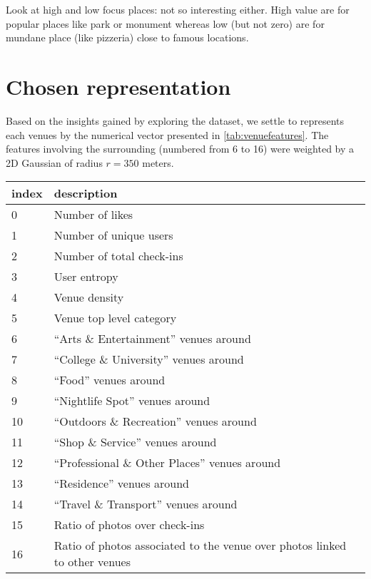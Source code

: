 Look at high and low focus places: not so interesting either. High value are
for popular places like park or monument whereas low (but not zero) are for
mundane place (like pizzeria) close to famous locations.

\section{Chosen representation}

Based on the insights gained by exploring the dataset, we settle to represents
each venues by the numerical vector presented in \autoref{tab:venuefeatures}.
The features involving the surrounding (numbered from 6 to 16) were weighted
by a 2D Gaussian of radius $r=350$ meters.

\begin{table}[hb]
    \centering
    \begin{tabularx}{\textwidth}{lX}
        \toprule
        index & description \\
        \midrule
	\datasetRow{}0 & Number of likes \\
	\datasetRow{}1 & Number of unique users \\
	\datasetRow{}2 & Number of total check-ins \\
        3 & User entropy \\
        4 & Venue density \\
	\datasetRow{}5 & Venue top level category \\
        6 & \enquote{Arts \& Entertainment} venues around \\
        7 & \enquote{College \& University} venues around \\
        8 & \enquote{Food} venues around \\
        9 & \enquote{Nightlife Spot} venues around \\
        10 & \enquote{Outdoors \& Recreation} venues around \\
        11 & \enquote{Shop \& Service} venues around \\
        12 & \enquote{Professional \& Other Places} venues around \\
        13 & \enquote{Residence} venues around \\
        14 & \enquote{Travel \& Transport} venues around \\
	15 & Ratio of photos over check-ins \\
	16 & Ratio of photos associated to the venue over photos linked to other venues \\

\end{tabularx}
\end{table}

